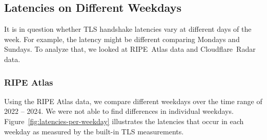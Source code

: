 \subsection{Latencies on Different Weekdays}
\label{sec:latency-weekdays}

It is in question whether TLS handshake latencies vary at different days of the
week. For example, the latency might be different comparing Mondays and
Sundays. To analyze that, we looked at RIPE~Atlas data and Cloudflare~Radar
data.

\subsubsection*{RIPE Atlas}

Using the RIPE Atlas data, we compare different weekdays over the time range of
2022 -- 2024. We were not able to find differences in individual weekdays.
Figure~\ref{fig:latencies-per-weekday} illustrates the latencies that occur in
each weekday as measured by the built-in TLS measurements.

